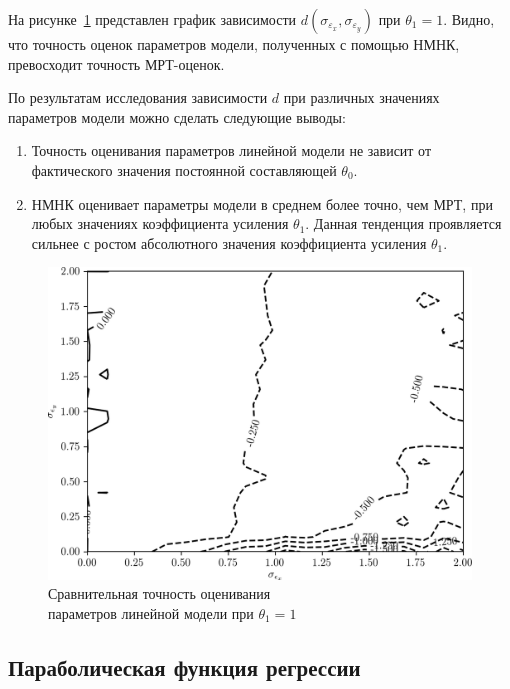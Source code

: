 На рисунке~\ref{fig:comparison_nonlinear_linear}
представлен график зависимости \( d(\sigma_{\varepsilon_x}, \sigma_{\varepsilon_y}) \)
при \( \theta_1 = 1 \).
Видно, что точность оценок параметров модели, полученных с помощью НМНК,
превосходит точность МРТ-оценок.

По результатам исследования зависимости \( d \) при различных значениях
параметров модели можно сделать следующие выводы:
\begin{enumerate}
\item Точность оценивания параметров линейной модели не зависит
  от фактического значения постоянной составляющей \( \theta_0 \).
\item НМНК оценивает параметры модели в среднем более точно, чем МРТ,
  при любых значениях коэффициента усиления \( \theta_1 \).
  Данная тенденция проявляется сильнее с ростом абсолютного значения
  коэффициента усиления \( \theta_1 \).
\end{enumerate}

\begin{figure}[b]
  \centering
  \includegraphics[width=135mm]{fig/nonlinear/linear/a-0_b-1.png}
  \caption{
    Сравнительная точность оценивания \\
    параметров линейной модели при \( \theta_1 = 1 \)
  }\label{fig:comparison_nonlinear_linear}
\end{figure}

\vspace{2\baselineskip}
\subsection{Параболическая функция регрессии}

